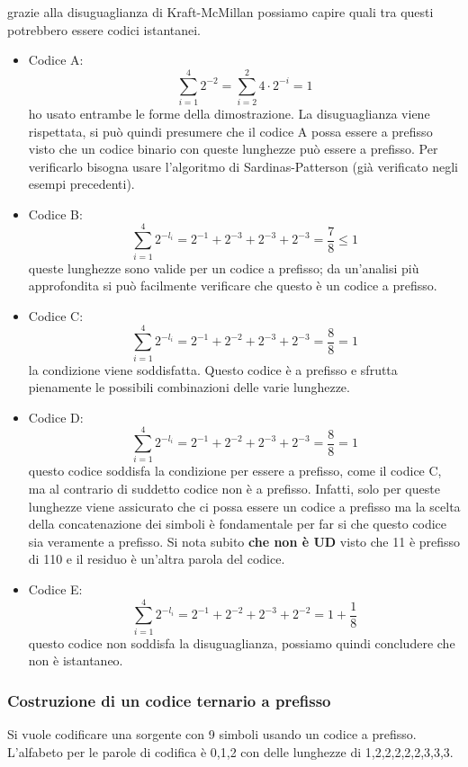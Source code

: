 \documentclass{article}
\theoremstyle{definition}
\numberwithin{equation}{section}
\begin{document}
grazie alla disuguaglianza di Kraft-McMillan possiamo capire quali tra questi potrebbero essere codici istantanei.
\begin{itemize}
    \item Codice A:
          \[
              \sum_{i=1}^4 2^{-2}=\sum_{i=2}^2 4\cdot 2^{-i}=1
          \]
          ho usato entrambe le forme della dimostrazione. La disuguaglianza viene rispettata, si può quindi presumere che il codice A possa essere a prefisso visto che un codice binario con queste lunghezze può essere a prefisso. Per verificarlo bisogna usare l'algoritmo di Sardinas-Patterson (già verificato negli esempi precedenti).
    \item Codice B:
          \[
              \sum_{i=1}^4 2^{-l_i}=2^{-1}+2^{-3}+2^{-3}+2^{-3}=\frac{7}{8}\leq 1
          \]
          queste lunghezze sono valide per un codice a prefisso; da un'analisi più approfondita si può facilmente verificare che questo è un codice a prefisso.
    \item Codice C:
          \[
              \sum_{i=1}^4 2^{-l_i}=2^{-1}+2^{-2}+2^{-3}+2^{-3}=\frac{8}{8}= 1
          \]
          la condizione viene soddisfatta. Questo codice è a prefisso e sfrutta pienamente le possibili combinazioni delle varie lunghezze.
    \item Codice D:
          \[
              \sum_{i=1}^4 2^{-l_i}=2^{-1}+2^{-2}+2^{-3}+2^{-3}=\frac{8}{8}= 1
          \]
          questo codice soddisfa la condizione per essere a prefisso, come il codice C, ma al contrario di suddetto codice non è a prefisso. Infatti, solo per queste lunghezze viene assicurato che ci possa essere un codice a prefisso ma la scelta della concatenazione dei simboli è fondamentale per far si che questo codice sia veramente a prefisso. Si nota subito \textbf{che non è UD } visto che 11 è prefisso di 110 e il residuo è un'altra parola del codice.
    \item Codice E:
          \[
              \sum_{i=1}^4 2^{-l_i}=2^{-1}+2^{-2}+2^{-3}+2^{-2}=1+\frac{1}{8}
          \]
          questo codice non soddisfa la disuguaglianza, possiamo quindi concludere che non è istantaneo.
\end{itemize}
\subsubsection{Costruzione di un codice ternario a prefisso}
Si vuole codificare una sorgente con 9 simboli usando un codice a prefisso. L'alfabeto per le parole di codifica è {0,1,2} con delle lunghezze di 1,2,2,2,2,2,3,3,3.
\end{document}
